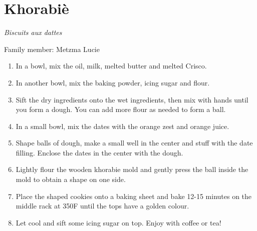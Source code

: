 \chapter{Khorabiè}
\label{ch:khorabie}


\textit{Biscuits aux dattes}

Family member: Metzma Lucie



\begin{enumerate}
    \item In a bowl, mix the oil, milk, melted butter and melted Crisco.
    \item In another bowl, mix the baking powder, icing sugar and flour.
    \item Sift the dry ingredients onto the wet ingredients, then mix with hands until you form a dough. You can add more flour as needed to form a ball.
    \item In a small bowl, mix the dates with the orange zest and orange juice.
    \item Shape balls of dough, make a small well in the center and stuff with the date filling. Enclose the dates in the center with the dough.
    \item Lightly flour the wooden khorabie mold and gently press the ball inside the mold to obtain a shape on one side.
    \item Place the shaped cookies onto a baking sheet and bake 12-15 minutes on the middle rack at 350\degree F until the tops have a golden colour.
    \item Let cool and sift some icing sugar on top. Enjoy with coffee or tea!
\end{enumerate}
